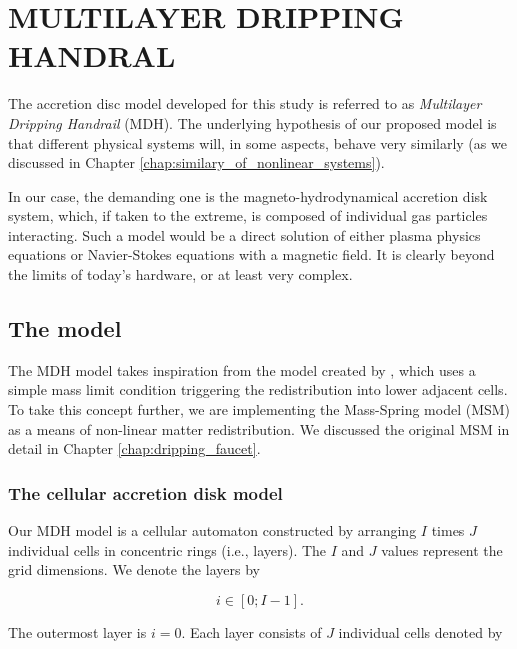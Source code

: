 \chapter{MULTILAYER DRIPPING HANDRAL}
\thispagestyle{empty}


The accretion disc model developed for this study is referred to as \emph{Multilayer Dripping Handrail} (MDH). The underlying hypothesis of our proposed model is that different physical systems will, in some aspects, behave very similarly (as we discussed in Chapter \ref{chap:similary_of_nonlinear_systems}). 

In our case, the demanding one is the magneto-hydrodynamical accretion disk system, which, if taken to the extreme, is composed of individual gas particles interacting. Such a model would be a direct solution of either plasma physics equations or Navier-Stokes equations with a magnetic field. It is clearly beyond the limits of today's hardware, or at least very complex. 


\section{The model}

The MDH model takes inspiration from the model created by \cite{yonehara1997}, which uses a simple mass limit condition triggering the redistribution into lower adjacent cells. To take this concept further, we are implementing the Mass-Spring model (MSM) as a means of non-linear matter redistribution. We discussed the original MSM in detail in Chapter \ref{chap:dripping_faucet}. 

\subsection{The cellular accretion disk model}

Our MDH model is a cellular automaton constructed by arranging $I$ times $J$ individual cells in concentric rings (i.e., layers). The $I$ and $J$ values represent the grid dimensions. We denote the layers by 

\begin{equation}
i \in [0;I-1].
\end{equation}

The outermost layer is $i=0$. Each layer consists of $J$ individual cells denoted by

